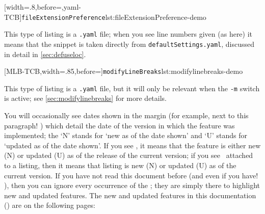 	\begin{minipage}{.4\textwidth}
		[width=.8\linewidth,before=\centering,yaml-TCB]{\texttt{fileExtensionPreference}}{lst:fileExtensionPreference-demo}
	\end{minipage}%
	\hfill
	\begin{minipage}{.4\textwidth}
		This type of listing is a \texttt{.yaml} file; when you see line numbers given (as here) it means that the snippet is taken directly from \texttt{defaultSettings.yaml}, discussed in detail in \vref{sec:defuseloc}.
	\end{minipage}%

	\begin{minipage}{.55\textwidth}
		[MLB-TCB,width=.85\linewidth,before=\centering]{\texttt{modifyLineBreaks}}{lst:modifylinebreaks-demo}
	\end{minipage}%
	\hfill
	\begin{minipage}{.4\textwidth}
		This type of listing is a \texttt{.yaml} file, but it will only be relevant when the \texttt{-m} switch is active; see \vref{sec:modifylinebreaks} for more details.
	\end{minipage}%

	You will occasionally see dates shown in the margin (for example, next to this paragraph!
	)
	 which detail the date of the version in which the feature was implemented;
	the `N' stands for `new as of the date shown' and `U' stands for `updated as of the date shown'.
	If you see \stardemo, it means that the feature is either new (N) or updated (U) as of the release of the current version; if you see \stardemo\, attached to a listing, then it means that listing is new (N) or updated (U) as of the current version.
	If you have not read this document before (and even if you have!
	), then you can ignore every occurrence of the \stardemo;
	they are simply there to highlight new and updated features.
	The new and updated features in this documentation (\gitRel) are on the following pages: \listOfNewFeatures 

